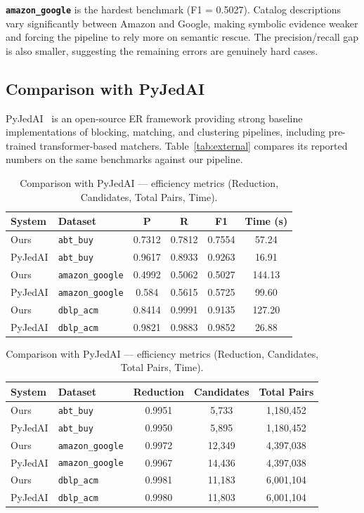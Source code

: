 \documentclass[10pt,twocolumn]{article}
\begin{document}
\textbf{\texttt{amazon\_google}} is the hardest benchmark (F1 = 0.5027).
Catalog descriptions vary significantly between Amazon and Google, making
symbolic evidence weaker and forcing the pipeline to rely more on semantic
rescue. The precision/recall gap is also smaller, suggesting the remaining
errors are genuinely hard cases.

\subsection{Comparison with PyJedAI}

PyJedAI~\cite{pyjedai} is an open-source ER framework providing strong
baseline implementations of blocking, matching, and clustering pipelines,
including pre-trained transformer-based matchers. Table~\ref{tab:external}
compares its reported numbers on the same benchmarks against our pipeline.

\begin{table}[h!]
\centering
\caption{Comparison with PyJedAI --- quality metrics (P, R, F1).}
\label{tab:external}
\small
\begin{tabular}{llcccc}
\toprule
System & Dataset & P & R & F1 & Time (s) \\
\midrule
Ours         & \texttt{abt\_buy}       & 0.7312 & 0.7812 & 0.7554 & 57.24  \\
PyJedAI      & \texttt{abt\_buy}       & 0.9617 & 0.8933 & 0.9263 & 16.91  \\
\midrule
Ours         & \texttt{amazon\_google} & 0.4992 & 0.5062 & 0.5027 & 144.13 \\
PyJedAI      & \texttt{amazon\_google} & 0.584  & 0.5615 & 0.5725 & 99.60  \\
\midrule
Ours         & \texttt{dblp\_acm}      & 0.8414 & 0.9991 & 0.9135 & 127.20 \\
PyJedAI      & \texttt{dblp\_acm}      & 0.9821 & 0.9883 & 0.9852 & 26.88  \\
\bottomrule
\end{tabular}

\vspace{0.8em}

\caption{Comparison with PyJedAI --- efficiency metrics (Reduction, Candidates, Total Pairs, Time).}
\label{tab:external2}
\small
\begin{tabular}{llccc}
\toprule
System & Dataset & Reduction & Candidates & Total Pairs \\
\midrule
Ours         & \texttt{abt\_buy}       & 0.9951 & 5,733  & 1,180,452 \\
PyJedAI      & \texttt{abt\_buy}       & 0.9950 & 5,895  & 1,180,452 \\
\midrule
Ours         & \texttt{amazon\_google} & 0.9972 & 12,349 & 4,397,038 \\
PyJedAI      & \texttt{amazon\_google} & 0.9967 & 14,436 & 4,397,038 \\
\midrule
Ours         & \texttt{dblp\_acm}      & 0.9981 & 11,183 & 6,001,104 \\
PyJedAI      & \texttt{dblp\_acm}      & 0.9980 & 11,803 & 6,001,104 \\
\bottomrule
\end{tabular}
\end{table}
\end{document}
